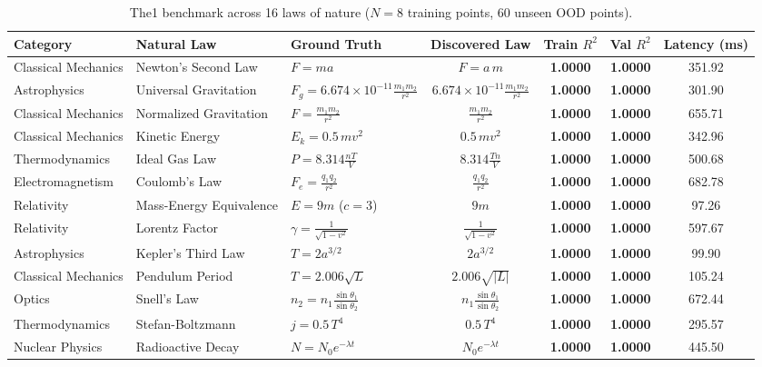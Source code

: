 \documentclass[10pt,journal,compsoc]{IEEEtran}
\begin{document}
\begin{table}[t]
\centering
\caption{The1 benchmark across 16 laws of nature ($N=8$ training points, 60 unseen OOD points).}
\label{tab:benchmark}
\begin{tabular}{lllcccc}
\toprule
\textbf{Category} & \textbf{Natural Law} & \textbf{Ground Truth} & \textbf{Discovered Law} & \textbf{Train $R^2$} & \textbf{Val $R^2$} & \textbf{Latency (ms)} \\
\midrule
Classical Mechanics & Newton's Second Law & $F = m a$ & $F = a\,m$ & \textbf{1.0000} & \textbf{1.0000} & 351.92 \\
Astrophysics & Universal Gravitation & $F_g = 6.674\!\times\!10^{-11}\frac{m_1 m_2}{r^2}$ & $6.674\!\times\!10^{-11}\frac{m_1 m_2}{r^2}$ & \textbf{1.0000} & \textbf{1.0000} & 301.90 \\
Classical Mechanics & Normalized Gravitation & $F = \frac{m_1 m_2}{r^2}$ & $\frac{m_1 m_2}{r^2}$ & \textbf{1.0000} & \textbf{1.0000} & 655.71 \\
Classical Mechanics & Kinetic Energy & $E_k = 0.5\,m v^2$ & $0.5\,m v^2$ & \textbf{1.0000} & \textbf{1.0000} & 342.96 \\
Thermodynamics & Ideal Gas Law & $P = 8.314\frac{nT}{V}$ & $8.314\frac{Tn}{V}$ & \textbf{1.0000} & \textbf{1.0000} & 500.68 \\
Electromagnetism & Coulomb's Law & $F_e = \frac{q_1 q_2}{r^2}$ & $\frac{q_1 q_2}{r^2}$ & \textbf{1.0000} & \textbf{1.0000} & 682.78 \\
Relativity & Mass-Energy Equivalence & $E = 9m$ ($c=3$) & $9m$ & \textbf{1.0000} & \textbf{1.0000} & 97.26 \\
Relativity & Lorentz Factor & $\gamma = \frac{1}{\sqrt{1-v^2}}$ & $\frac{1}{\sqrt{1-v^2}}$ & \textbf{1.0000} & \textbf{1.0000} & 597.67 \\
Astrophysics & Kepler's Third Law & $T = 2a^{3/2}$ & $2a^{3/2}$ & \textbf{1.0000} & \textbf{1.0000} & 99.90 \\
Classical Mechanics & Pendulum Period & $T = 2.006\sqrt{L}$ & $2.006\sqrt{|L|}$ & \textbf{1.0000} & \textbf{1.0000} & 105.24 \\
Optics & Snell's Law & $n_2 = n_1\frac{\sin\theta_1}{\sin\theta_2}$ & $n_1\frac{\sin\theta_1}{\sin\theta_2}$ & \textbf{1.0000} & \textbf{1.0000} & 672.44 \\
Thermodynamics & Stefan-Boltzmann & $j = 0.5\,T^4$ & $0.5\,T^4$ & \textbf{1.0000} & \textbf{1.0000} & 295.57 \\
Nuclear Physics & Radioactive Decay & $N = N_0 e^{-\lambda t}$ & $N_0 e^{-\lambda t}$ & \textbf{1.0000} & \textbf{1.0000} & 445.50 \\

\end{tabular}
\end{table}
\end{document}

